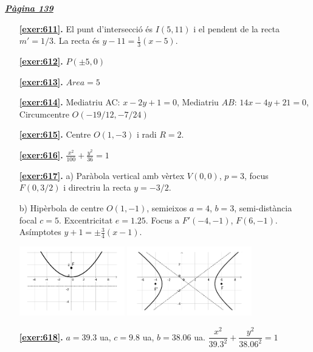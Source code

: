 \hyperlink{page.139}{\textbf{\em Pàgina 139}}
\begin{enumerate}
\item[\fontfamily{phv}\selectfont\color{blue}\textbf{\ref{exer:611}. }] \label{ans:611} 
El punt d'intersecció és $I(5,11)$ i el pendent de la recta $m'=1/3$. La recta és $y-11=\frac {1}{3}(x-5)$.
 \end{enumerate}
\begin{enumerate}
\item[\fontfamily{phv}\selectfont\color{blue}\textbf{\ref{exer:612}. }] \label{ans:612} 
$P(\pm 5, 0)$
\item[\fontfamily{phv}\selectfont\color{blue}\textbf{\ref{exer:613}. }] \label{ans:613} 
$Area=5$
\item[\fontfamily{phv}\selectfont\color{blue}\textbf{\ref{exer:614}. }] \label{ans:614} 
Mediatriu AC: $x-2y+1=0$, Mediatriu $AB$: $14x-4y+21=0$, Circumcentre $O(-19/12, -7/24)$
\item[\fontfamily{phv}\selectfont\color{blue}\textbf{\ref{exer:615}. }] \label{ans:615} 
Centre $O(1,-3)$ i radi $R=2$.
\item[\fontfamily{phv}\selectfont\color{blue}\textbf{\ref{exer:616}. }] \label{ans:616} 
$\frac {x^2}{100}+\frac {y^2}{36}=1$
\item[\fontfamily{phv}\selectfont\color{blue}\textbf{\ref{exer:617}. }] \label{ans:617} 
 a) Paràbola vertical amb vèrtex $V(0,0)$, $p=3$, focus $F(0,3/2)$ i directriu la recta $y=-3/2$. \par b) Hipèrbola de centre $O(1,-1)$, semieixos $a=4$, $b=3$, semi-distància focal $c=5$. Excentricitat $e=1.25$. Focus a $F'(-4,-1)$, $F(6,-1)$. Asímptotes $y+1=\pm \frac {3}{4}(x-1)$. \par \begin {center} \includegraphics [height=3cm]{img-10-bloc3/bloc3-sol-14a} \includegraphics [height=3cm]{img-10-bloc3/bloc3-sol-14b} \end {center} 
\item[\fontfamily{phv}\selectfont\color{blue}\textbf{\ref{exer:618}. }] \label{ans:618} 
$a=39.3$ ua, $c=9.8$ ua, $b=38.06$ ua. $\dfrac {x^2}{39.3^2}+\dfrac {y^2}{38.06^2}=1$
 \end{enumerate}

